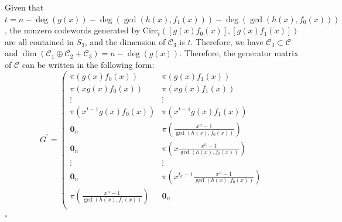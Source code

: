 \documentclass[journal]{IEEEtran}
\newenvironment{proof}{{\noindent\it Proof:} }{\hfill $\square$\par}
\begin{document}
\begin{proof}
	Given that $t=n-\deg(g(x))-\deg(\gcd( h(x),f_1(x)))-\deg(\gcd( h(x),f_0(x)))$, the nonzero codewords generated by $\mathrm{Circ}_t\left( \left[g(x)f_0(x)\right],\left[g(x)f_1(x)\right] \right)$ are all contained in $S_3$, and the dimension of $\mathscr{C}_3$ is $t$. Therefore, we have $\mathscr{C}_3\subset \mathscr{C}$ and $\dim(\mathscr{C}_1\oplus \mathscr{C}_2+\mathscr{C}_3)=n-\deg(g(x))$. 
	Therefore, the generator matrix of $\mathscr{C}$ can be written in the following form:
		\begin{equation}\label{QCtransform}
	G^{\prime}=
	\left(\begin{array}{c|c}
		\pi( g(x)f_0(x))                                                                  & \pi( g(x)f_1(x))                                                             \\
		
		\pi(x g(x)f_0(x))                                                                 & \pi(x g(x)f_1(x))                                                            \\
		
		\vdots                                                                           & \vdots                                                                      \\
		
		\pi(x^{t-1} g(x)f_0(x))         & \pi(x^{t-1}g(x)f_1(x))     \\
		\hline
		\mathbf{0}_n                                                                     & \pi( \frac{x^n-1}{\gcd( h(x),f_0(x))})                                  \\
		\mathbf{0}_n                                                                     & \pi(x \frac{x^n-1}{\gcd( h(x),f_0(x))} )                                \\
		\vdots                                                                           & \vdots                                                                      \\
		\mathbf{0}_n                                                                     & \pi(x^{t_a-1}   \frac{x^n-1}{\gcd( h(x),f_0(x))})\\		\hline
  		\pi( \frac{x^n-1}{\gcd( h(x),f_1(x))})                                 & \mathbf{0}_n                                                                \\
		

\end{array}
\end{equation}
\end{proof}
\end{document}
